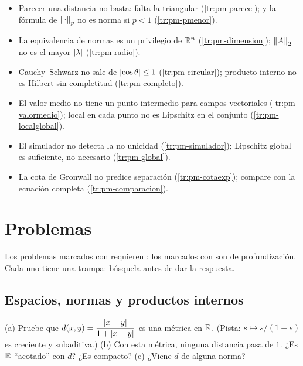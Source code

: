 \begin{trampa}[title={\faBug\hspace{0.45em}Las trampas del capítulo, en una caja}]{}
\begin{itemize}
  \item Parecer una distancia no basta: falta la triangular (\cref{tr:pm-parece}); y la fórmula de $\left\lVert \cdot\right\rVert_p$ no es norma si $p<1$ (\cref{tr:pm-pmenor}).
  \item La equivalencia de normas es un privilegio de $\mathbb{R}^n$ (\cref{tr:pm-dimension}); $\left\lVert A\right\rVert_2$ no es el mayor $\left\lvert \lambda\right\rvert$ (\cref{tr:pm-radio}).
  \item Cauchy--Schwarz no sale de $\left\lvert \cos\theta\right\rvert\le1$ (\cref{tr:pm-circular}); producto interno no es Hilbert sin completitud (\cref{tr:pm-completo}).
  \item El valor medio no tiene un punto intermedio para campos vectoriales (\cref{tr:pm-valormedio}); local en cada punto no es Lipschitz en el conjunto (\cref{tr:pm-localglobal}).
  \item El simulador no detecta la no unicidad (\cref{tr:pm-simulador}); Lipschitz global es suficiente, no necesario (\cref{tr:pm-global}).
  \item La cota de Gronwall no predice separación (\cref{tr:pm-cotaexp}); compare con la ecuación completa (\cref{tr:pm-comparacion}).
\end{itemize}
\end{trampa}


\section{Problemas}
\label{sec:pm-problemas}

Los problemas marcados con \etiquetaM{} requieren \matlab; los marcados con \etiquetaEstrella{} son de profundización. Cada uno tiene una trampa: búsquela antes de dar la respuesta.

\subsection*{Espacios, normas y productos internos}

\begin{problema}\label{prob:pm-acotada}
(a) Pruebe que $d(x,y)=\dfrac{\left\lvert x-y\right\rvert}{1+\left\lvert x-y\right\rvert}$ es una métrica en $\mathbb{R}$. (Pista: $s\mapsto s/(1+s)$ es creciente y subaditiva.) (b) Con esta métrica, ninguna distancia pasa de $1$. ¿Es $\mathbb{R}$ ``acotado'' con $d$? ¿Es compacto? (c) ¿Viene $d$ de alguna norma?
\end{problema}

